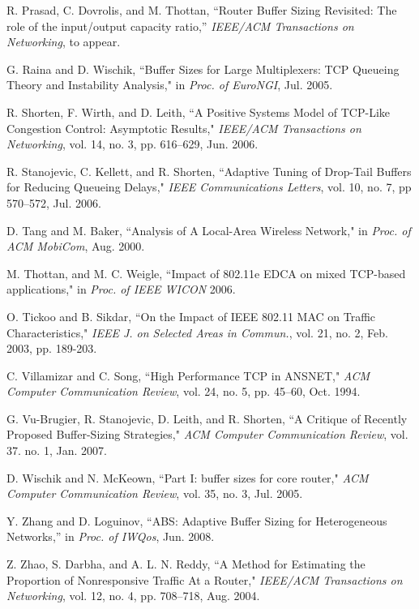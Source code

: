 \documentclass[10pt,twocolumn, journal]{IEEEtran}
\begin{document}
\begin{thebibliography}{}
R. Prasad, C. Dovrolis, and M. Thottan, ``Router Buffer Sizing Revisited: The role of the input/output capacity ratio,'' \emph{IEEE/ACM Transactions on Networking}, to appear.


G. Raina and D. Wischik, ``Buffer Sizes for Large Multiplexers: TCP Queueing Theory and
Instability Analysis," in \emph{Proc. of EuroNGI}, Jul. 2005.


R. Shorten, F. Wirth, and D. Leith, ``A Positive Systems Model of TCP-Like Congestion
Control: Asymptotic Results," \emph{IEEE/ACM Transactions on Networking}, vol. 14, no. 3,
pp. 616--629, Jun. 2006.

R. Stanojevic, C. Kellett, and R. Shorten, ``Adaptive Tuning of Drop-Tail Buffers for
Reducing Queueing Delays," \emph{IEEE Communications Letters}, vol. 10, no. 7, pp
570--572, Jul. 2006.

D. Tang and M. Baker, ``Analysis of A Local-Area Wireless Network," in \emph{Proc. of ACM
MobiCom}, Aug. 2000.


M. Thottan, and M. C. Weigle, ``Impact of 802.11e EDCA on mixed TCP-based applications,"
in \emph{Proc. of IEEE WICON} 2006.


O. Tickoo and B. Sikdar, ``On the Impact of IEEE 802.11 MAC on Traffic Characteristics,"
\emph{IEEE J. on Selected Areas in Commun.}, vol. 21, no. 2, Feb. 2003, pp. 189-203.



C. Villamizar and C. Song, ``High Performance TCP in ANSNET," \emph{ACM Computer
Communication Review}, vol. 24, no. 5, pp. 45--60, Oct. 1994.

G. Vu-Brugier, R. Stanojevic, D. Leith, and R. Shorten, ``A Critique of Recently Proposed
Buffer-Sizing Strategies," \emph{ACM Computer Communication Review}, vol. 37. no. 1, Jan.
2007.

D. Wischik and N. McKeown, ``Part I: buffer sizes for core router," \emph{ACM Computer
Communication Review}, vol. 35, no. 3, Jul. 2005.


Y. Zhang and D. Loguinov, ``ABS: Adaptive Buffer Sizing for Heterogeneous Networks,'' in \emph{Proc. of IWQos}, Jun. 2008.


Z. Zhao, S. Darbha, and A. L. N. Reddy, ``A Method for Estimating the Proportion of
Nonresponsive Traffic At a Router," \emph{IEEE/ACM Transactions on Networking}, vol. 12,
no. 4, pp. 708--718, Aug. 2004.

\end{thebibliography}
\end{document}

